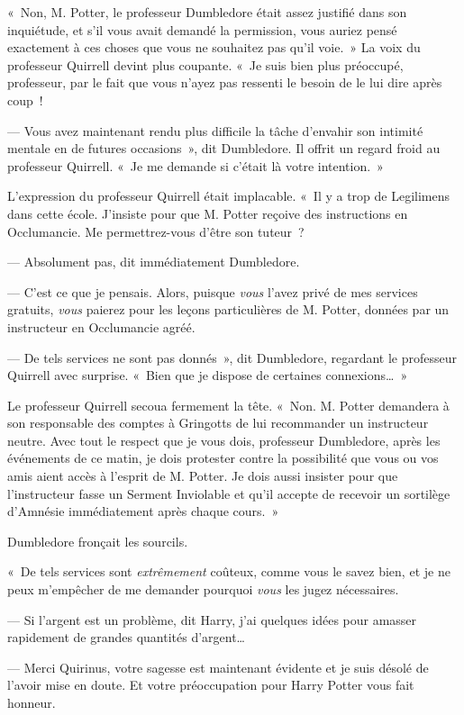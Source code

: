 «~Non, M. Potter, le professeur Dumbledore était assez justifié dans son inquiétude, et s'il vous avait demandé la permission, vous auriez pensé exactement à ces choses que vous ne souhaitez pas qu'il voie.~» La voix du professeur Quirrell devint plus coupante. «~Je suis bien plus préoccupé, professeur, par le fait que vous n'ayez pas ressenti le besoin de le lui dire après coup~!

--- Vous avez maintenant rendu plus difficile la tâche d'envahir son intimité mentale en de futures occasions~», dit Dumbledore. Il offrit un regard froid au professeur Quirrell. «~Je me demande si c'était là votre intention.~»

L'expression du professeur Quirrell était implacable. «~Il y a trop de Legilimens dans cette école. J'insiste pour que M. Potter reçoive des instructions en Occlumancie. Me permettrez-vous d'être son tuteur~?

--- Absolument pas, dit immédiatement Dumbledore.

--- C'est ce que je pensais. Alors, puisque \emph{vous} l'avez privé de mes services gratuits, \emph{vous} paierez pour les leçons particulières de M. Potter, données par un instructeur en Occlumancie agréé.

--- De tels services ne sont pas donnés~», dit Dumbledore, regardant le professeur Quirrell avec surprise. «~Bien que je dispose de certaines connexions…~»

Le professeur Quirrell secoua fermement la tête. «~Non. M. Potter demandera à son responsable des comptes à Gringotts de lui recommander un instructeur neutre. Avec tout le respect que je vous dois, professeur Dumbledore, après les événements de ce matin, je dois protester contre la possibilité que vous ou vos amis aient accès à l'esprit de M. Potter. Je dois aussi insister pour que l'instructeur fasse un Serment Inviolable et qu'il accepte de recevoir un sortilège d'Amnésie immédiatement après chaque cours.~»

Dumbledore fronçait les sourcils.

«~De tels services sont \emph{extrêmement} coûteux, comme vous le savez bien, et je ne peux m'empêcher de me demander pourquoi \emph{vous} les jugez nécessaires.

--- Si l'argent est un problème, dit Harry, j'ai quelques idées pour amasser rapidement de grandes quantités d'argent…

--- Merci Quirinus, votre sagesse est maintenant évidente et je suis désolé de l'avoir mise en doute. Et votre préoccupation pour Harry Potter vous fait honneur.

